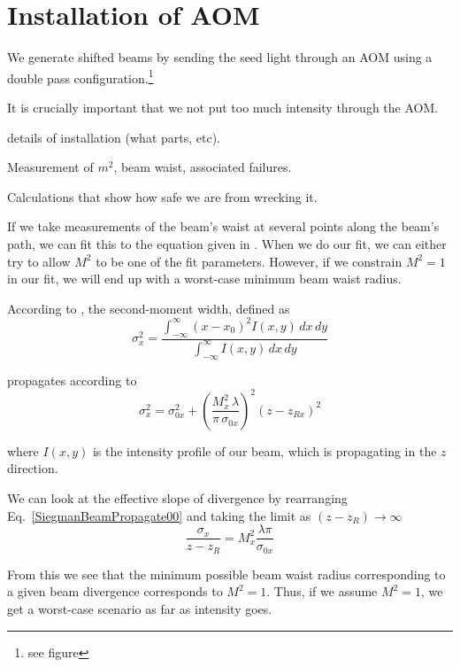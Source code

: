 \section{Installation of AOM}

We generate shifted beams by sending the seed light through an AOM using a double pass configuration.\footnote{see figure} 

It is crucially important that we not put too much intensity through the AOM. 

details of installation (what parts, etc). 

Measurement of $m^2$, beam waist, associated failures. 

Calculations that show how safe we are from wrecking it. 


If we take measurements of the beam's waist at several points along the beam's path, we can fit this to the equation given in \cite{SiegmanBeamQuality}. When we do our fit, we can either try to allow $M^2$ to be one of the fit parameters. However, if we constrain $M^2=1$ in our fit, we will end up with a worst-case minimum beam waist radius. 

According to \cite{SiegmanBeamQuality}, the second-moment width, defined as 
\begin{equation}
\sigma_x^2=\frac{\int_{-\infty}^{\infty} (x-x_0)^2 I(x,y)\, dx\, dy}{\int_{-\infty}^{\infty} I(x,y)\, dx \, dy}
\end{equation} 

propagates according to 
\begin{equation}
\sigma_x^2=\sigma_{0x}^2+\left( \frac{M_x^2 \,\lambda}{\pi \, \sigma_{0x}}\right)^2 (z-z_{Rx})^2 \label{SiegmanBeamPropagate00}
\end{equation}
 
where $I(x,y)$ is the intensity profile of our beam, which is propagating in the $z$ direction. 

We can look at the effective slope of divergence by rearranging Eq.\ \ref{SiegmanBeamPropagate00} and taking the limit as $(z-z_R) \rightarrow \infty$
\begin{equation}
\frac{\sigma_x}{z-z_R}=M_x^2 \frac{\lambda \pi}{\sigma_{0x}} \label{SiegmanBeamSlope}
\end{equation}

From this we see that the minimum possible beam waist radius corresponding to a given beam divergence corresponds to $M^2=1$. Thus, if we assume $M^2=1$, we get a worst-case scenario as far as intensity goes. 

